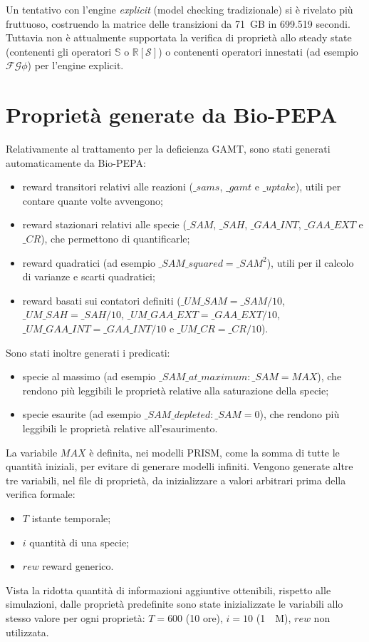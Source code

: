 Un tentativo con l'engine \emph{explicit} (model checking tradizionale) si \`e rivelato pi\`u fruttuoso, costruendo la matrice delle transizioni da \SI{71}{GB} in 699.519 secondi.
Tuttavia non \`e attualmente supportata la verifica di propriet\`a allo steady state (contenenti gli operatori $\mathbb{S}$ o $\mathbb{R}[\mathcal{S}]$) o contenenti operatori innestati (ad esempio $\mathcal{F} \mathcal{G} \phi$) per l'engine explicit.

\section{Propriet\`a generate da Bio-PEPA}\label{sez:propepa}
Relativamente al trattamento per la deficienza GAMT, sono stati generati automaticamente da Bio-PEPA:
\begin{itemize}
	\item reward transitori relativi alle reazioni ($\_sams$, $\_gamt$ e $\_uptake$), utili per contare quante volte avvengono;
	\item reward stazionari relativi alle specie ($\_SAM$, $\_SAH$, $\_GAA\_INT$, $\_GAA\_EXT$ e $\_CR$), che permettono di quantificarle;
	\item reward quadratici (ad esempio $\_SAM\_squared = \_SAM^2$), utili per il calcolo di varianze e scarti quadratici;
	\item reward basati sui contatori definiti ($\_UM\_SAM = \_SAM / 10$, $\_UM\_SAH = \_SAH / 10$, $\_UM\_GAA\_EXT = \_GAA\_EXT / 10$, $\_UM\_GAA\_INT = \_GAA\_INT / 10$ e $\_UM\_CR = \_CR / 10$).
\end{itemize}

Sono stati inoltre generati i predicati:
\begin{itemize}
	\item specie al massimo (ad esempio $\_SAM\_at\_maximum: \_SAM = MAX$), che rendono pi\`u leggibili le propriet\`a relative alla saturazione della specie;
	\item specie esaurite (ad esempio $\_SAM\_depleted: \_SAM = 0$), che rendono pi\`u leggibili le propriet\`a relative all'esaurimento.
\end{itemize}

La variabile $MAX$ \`e definita, nei modelli PRISM, come la somma di tutte le quantit\`a iniziali, per evitare di generare modelli infiniti.
Vengono generate altre tre variabili, nel file di propriet\`a, da inizializzare a valori arbitrari prima della verifica formale:
\begin{itemize}
	\item $T$ istante temporale;
	\item $i$ quantit\`a di una specie;
	\item $rew$ reward generico.
\end{itemize}
Vista la ridotta quantit\`a di informazioni aggiuntive ottenibili, rispetto alle simulazioni, dalle propriet\`a predefinite sono state inizializzate le variabili allo stesso valore per ogni propriet\`a: $T = 600$ (10 ore), $i = 10$ (\SI{1}{\mu M}), $rew$ non utilizzata.

